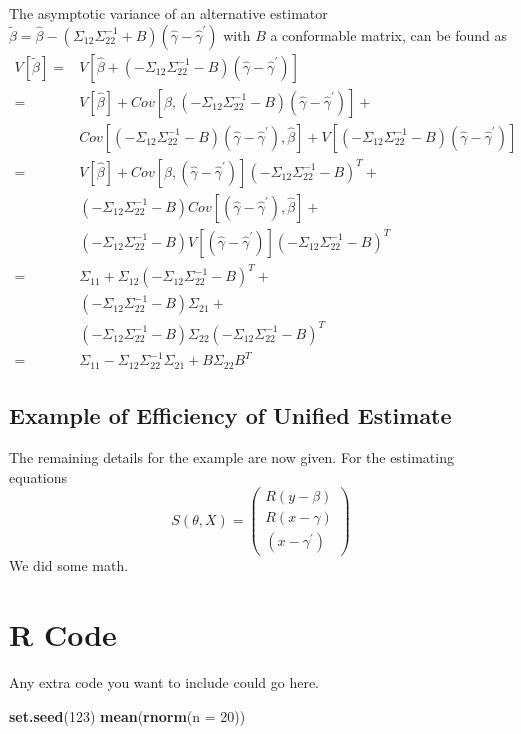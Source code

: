 \documentclass[
  12pt,
  openany, oneside]{book}
\newenvironment{Shaded}{\begin{snugshade}}{\end{snugshade}}
\newcommand{\AttributeTok}[1]{\textcolor[rgb]{0.13,0.29,0.53}{#1}}
\newcommand{\DecValTok}[1]{\textcolor[rgb]{0.00,0.00,0.81}{#1}}
\newcommand{\FunctionTok}[1]{\textcolor[rgb]{0.13,0.29,0.53}{\textbf{#1}}}
\newcommand{\NormalTok}[1]{#1}
\theoremstyle{definition}
\theoremstyle{definition}
\theoremstyle{definition}
\theoremstyle{definition}
\theoremstyle{remark}
\begin{document}
The asymptotic variance of an alternative estimator \(\tilde{\beta} = \hat{\beta} - (\Sigma_{12}\Sigma_{22}^{-1} + B)(\hat{\gamma} - \hat{\gamma}^{\prime})\) with \(B\) a conformable matrix, can be found as
\[
\begin{aligned}
V[\tilde\beta] = &V[\hat{\beta} + (-\Sigma_{12}\Sigma_{22}^{-1} - B)(\hat{\gamma} - \hat{\gamma}^{\prime})] \\
= &V[\hat{\beta}] +
Cov[\hat{\beta},(-\Sigma_{12}\Sigma_{22}^{-1} - B)(\hat{\gamma} - \hat{\gamma}^{\prime})] +\\
&Cov[(-\Sigma_{12}\Sigma_{22}^{-1} - B)(\hat{\gamma} - \hat{\gamma}^{\prime}),\hat{\beta}] +
V[(-\Sigma_{12}\Sigma_{22}^{-1} - B)(\hat{\gamma} - \hat{\gamma}^{\prime})]  \\
= &V[\hat{\beta}] + 
Cov[\hat{\beta},(\hat{\gamma} - \hat{\gamma}^{\prime})](-\Sigma_{12}\Sigma_{22}^{-1} - B)^T +\\
&(-\Sigma_{12}\Sigma_{22}^{-1} - B)Cov[(\hat{\gamma} - \hat{\gamma}^{\prime}),\hat{\beta}] +\\
&(-\Sigma_{12}\Sigma_{22}^{-1} - B)V[(\hat{\gamma} - \hat{\gamma}^{\prime})](-\Sigma_{12}\Sigma_{22}^{-1} - B)^T\\
= &\Sigma_{11} + 
\Sigma_{12}(-\Sigma_{12}\Sigma_{22}^{-1} - B)^T +\\
&(-\Sigma_{12}\Sigma_{22}^{-1} - B)\Sigma_{21} +\\
&(-\Sigma_{12}\Sigma_{22}^{-1} - B)\Sigma_{22}(-\Sigma_{12}\Sigma_{22}^{-1} - B)^T\\
= &\Sigma_{11} - \Sigma_{12}\Sigma_{22}^{-1}\Sigma_{21} + B\Sigma_{22}B^T
\end{aligned}
\]

\section{Example of Efficiency of Unified Estimate}\label{example-of-efficiency-of-unified-estimate}

The remaining details for the example are now given. For the estimating equations
\[
S(\theta,X) = \begin{pmatrix}
R(y - \beta)\\
R(x - \gamma)\\
(x - \gamma^{\prime})
\end{pmatrix}
\]
We did some math.

\chapter{R Code}\label{allrcode}

Any extra code you want to include could go here.

\begin{Shaded}
\begin{Highlighting}[]
\FunctionTok{set.seed}\NormalTok{(}\DecValTok{123}\NormalTok{)}
\FunctionTok{mean}\NormalTok{(}\FunctionTok{rnorm}\NormalTok{(}\AttributeTok{n =} \DecValTok{20}\NormalTok{))}
\end{Highlighting}
\end{Shaded}
\end{document}
